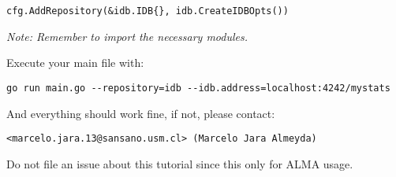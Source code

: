 \begin{lstlisting}[language=Golang]
cfg.AddRepository(&idb.IDB{}, idb.CreateIDBOpts())
\end{lstlisting}

\textit{Note: Remember to import the necessary modules.}

Execute your main file with:

\begin{lstlisting}
go run main.go --repository=idb --idb.address=localhost:4242/mystats
\end{lstlisting}

And everything should work fine, if not, please contact:

\begin{center}
\texttt{<marcelo.jara.13@sansano.usm.cl> (Marcelo Jara Almeyda)}
\end{center}

Do not file an issue about this tutorial since this only for ALMA usage.
